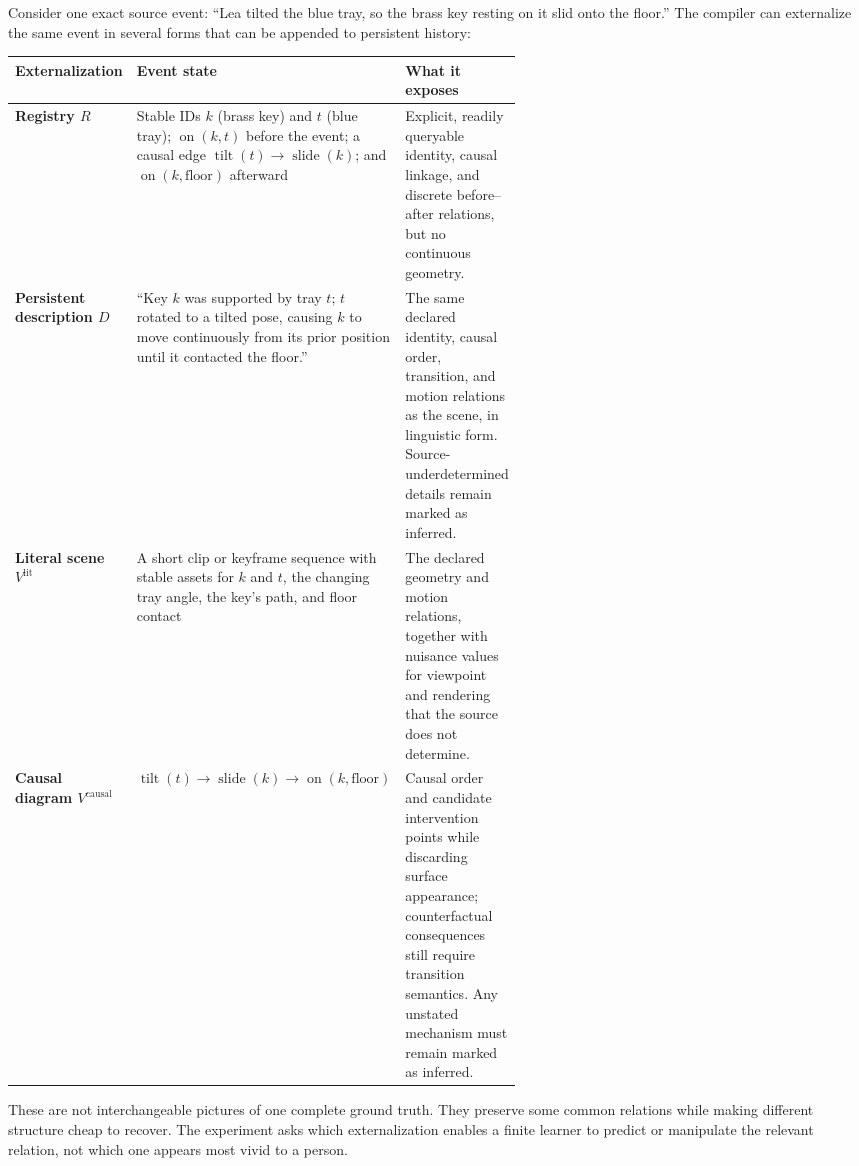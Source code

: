 \documentclass[11pt]{article}
\begin{document}
\begin{samepage}
Consider one exact source event: ``Lea tilted the blue tray, so the brass key resting on it slid onto the floor.'' The compiler can externalize the same event in several forms that can be appended to persistent history:

\begin{center}
\small
\begin{tabularx}{0.97\linewidth}{@{}>{\raggedright\arraybackslash\bfseries}p{0.20\linewidth}p{0.39\linewidth}X@{}}
\toprule
Externalization & Event state & What it exposes \\
\midrule
Registry $R$
& Stable IDs $k$ (brass key) and $t$ (blue tray); $\operatorname{on}(k,t)$ before the event; a causal edge $\operatorname{tilt}(t)\!\rightarrow\!\operatorname{slide}(k)$; and $\operatorname{on}(k,\mathrm{floor})$ afterward
& Explicit, readily queryable identity, causal linkage, and discrete before--after relations, but no continuous geometry. \\
Persistent description $D$
& ``Key $k$ was supported by tray $t$; $t$ rotated to a tilted pose, causing $k$ to move continuously from its prior position until it contacted the floor.''
& The same declared identity, causal order, transition, and motion relations as the scene, in linguistic form. Source-underdetermined details remain marked as inferred. \\
Literal scene $V^{\mathrm{lit}}$
& A short clip or keyframe sequence with stable assets for $k$ and $t$, the changing tray angle, the key's path, and floor contact
& The declared geometry and motion relations, together with nuisance values for viewpoint and rendering that the source does not determine. \\
Causal diagram $V^{\mathrm{causal}}$
& $\operatorname{tilt}(t)\rightarrow\operatorname{slide}(k)\rightarrow\operatorname{on}(k,\mathrm{floor})$
& Causal order and candidate intervention points while discarding surface appearance; counterfactual consequences still require transition semantics. Any unstated mechanism must remain marked as inferred. \\
\bottomrule
\end{tabularx}
\end{center}
\end{samepage}

These are not interchangeable pictures of one complete ground truth. They preserve some common relations while making different structure cheap to recover. The experiment asks which externalization enables a finite learner to predict or manipulate the relevant relation, not which one appears most vivid to a person.
\end{document}
